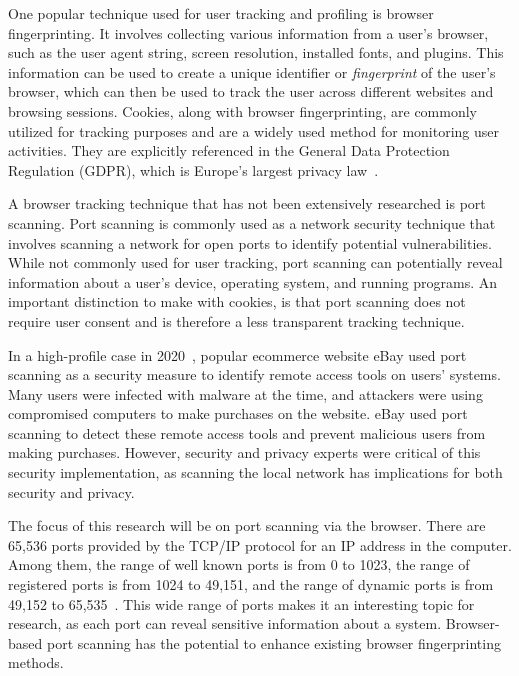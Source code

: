 One popular technique used for user tracking and profiling is browser fingerprinting. It involves collecting various information from a user's browser, such as the user agent string, screen resolution, installed fonts, and plugins. This information can be used to create a unique identifier or \emph{fingerprint} of the user's browser, which can then be used to track the user across different websites and browsing sessions. Cookies, along with browser fingerprinting, are commonly utilized for tracking purposes and are a widely used method for monitoring user activities. They are explicitly referenced in the General Data Protection Regulation (GDPR), which is Europe's largest privacy law~\cite{gdpr}.

A browser tracking technique that has not been extensively researched is port scanning. Port scanning is commonly used as a network security technique that involves scanning a network for open ports to identify potential vulnerabilities. While not commonly used for user tracking, port scanning can potentially reveal information about a user's device, operating system, and running programs. An important distinction to make with cookies, is that port scanning does not require user consent and is therefore a less transparent tracking technique.

In a high-profile case in 2020~\cite{forbes_ebay,ebay_port_scans}, popular ecommerce website eBay used port scanning as a security measure to identify remote access tools on users' systems. Many users were infected with malware at the time, and attackers were using compromised computers to make purchases on the website. eBay used port scanning to detect these remote access tools and prevent malicious users from making purchases. However, security and privacy experts were critical of this security implementation, as scanning the local network has implications for both security and privacy.

The focus of this research will be on port scanning via the browser. There are 65,536 ports provided by the TCP/IP protocol for an IP address in the computer. Among them, the range of well known ports is from 0 to 1023, the range of registered ports is from 1024 to 49,151, and the range of dynamic ports is from 49,152 to 65,535~\cite{yuan2020}.
This wide range of ports makes it an interesting topic for research, as each port can reveal sensitive information about a system. Browser-based port scanning has the potential to enhance existing browser fingerprinting methods.


